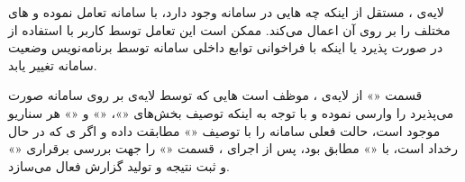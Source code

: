 لایه‌ی ، مستقل از اینکه چه ‌هایی در سامانه وجود
دارد، با سامانه تعامل نموده و ‌های مختلف را بر روی آن اعمال
می‌کند. ممکن است این تعامل توسط کاربر با استفاده از  در
 صورت پذیرد یا اینکه با فراخوانی توابع داخلی سامانه
توسط برنامه‌نویس وضعیت سامانه تغییر یابد.

قسمت «» از لایه‌ی ،
موظف است ‌هایی که توسط لایه‌ی  بر روی سامانه صورت
می‌پذیرد را وارسی نموده و با توجه به اینکه توصیف بخش‌های «»،
«» و «» هر سناریو موجود است، حالت فعلی سامانه را
با توصیف «» مطابقت داده و اگر ی که در حال رخداد
است، با «» مطابق بود، پس از اجرای ، قسمت
«» را جهت بررسی برقراری
«» و ثبت نتیجه و تولید گزارش فعال می‌سازد.

